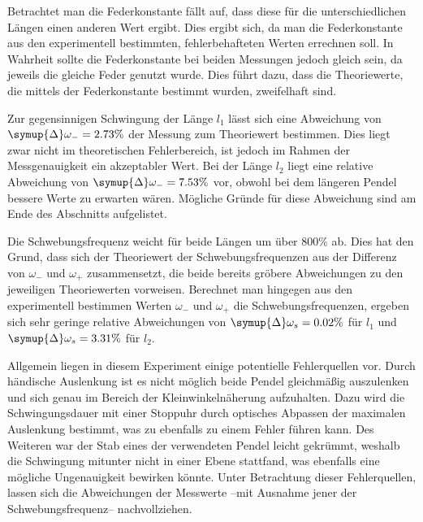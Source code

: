 Betrachtet man die Federkonstante fällt auf, dass diese für die unterschiedlichen Längen einen anderen Wert ergibt. Dies ergibt sich, da man die Federkonstante aus den experimentell
bestimmten, fehlerbehafteten Werten errechnen soll. In Wahrheit sollte die Federkonstante bei beiden Messungen jedoch gleich sein, da jeweils die gleiche Feder 
genutzt wurde. Dies führt dazu, dass die Theoriewerte, die mittels der Federkonstante bestimmt wurden, zweifelhaft sind.

Zur gegensinnigen Schwingung der Länge $l_1$ lässt sich eine Abweichung von $\symup{\Delta}\omega_{-} = 2.73\%$ der Messung zum Theoriewert bestimmen. 
Dies liegt zwar nicht im theoretischen Fehlerbereich, ist jedoch im Rahmen der Messgenauigkeit ein akzeptabler Wert.
Bei der Länge $l_2$ liegt eine relative Abweichung von $\symup{\Delta}\omega_{-} = 7.53\%$ vor, obwohl bei dem längeren Pendel bessere Werte zu erwarten wären. 
Mögliche Gründe für diese Abweichung sind am Ende des Abschnitts aufgelistet.

Die Schwebungsfrequenz weicht für beide Längen um über 800\% ab. Dies hat den Grund, dass sich der Theoriewert der Schwebungsfrequenzen aus der Differenz 
von $\omega_-$ und $\omega_+$ zusammensetzt, die beide bereits gröbere Abweichungen zu den jeweiligen Theoriewerten vorweisen. 
Berechnet man hingegen aus den experimentell bestimmen Werten $\omega_-$ und $\omega_+$ die Schwebungsfrequenzen, 
ergeben sich sehr geringe relative Abweichungen von $\symup{\Delta}\omega_{s} = 0.02\%$ für $l_1$ und $\symup{\Delta}\omega_{s} = 3.31\%$ für $l_2$. 

Allgemein liegen in diesem Experiment einige potentielle Fehlerquellen vor. Durch händische Auslenkung ist es nicht möglich beide Pendel gleichmäßig auszulenken und sich
genau im Bereich der Kleinwinkelnäherung aufzuhalten. Dazu wird die Schwingungsdauer mit einer Stoppuhr durch optisches Abpassen der maximalen Auslenkung bestimmt,
was zu ebenfalls zu einem Fehler führen kann. Des Weiteren war der Stab eines der verwendeten Pendel leicht gekrümmt, weshalb die Schwingung mitunter nicht in einer
Ebene stattfand, was ebenfalls eine mögliche Ungenauigkeit bewirken könnte.
Unter Betrachtung dieser Fehlerquellen, lassen sich die Abweichungen der Messwerte --mit Ausnahme jener der Schwebungsfrequenz-- nachvollziehen.
